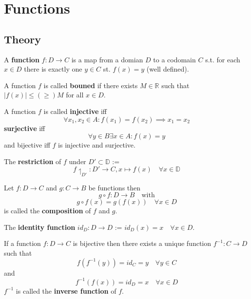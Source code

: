 \section{Functions}

\subsection{Theory}

\begin{definition}
    A \textbf{function} $f: D \to C$ is a map from a domian $D$ to a codomain $C$ s.t. for each $x \in D$ there is exactly one $y \in C$ st. $f(x) = y$ (well defined).
\end{definition}

\begin{definition}
    A function $f$ is called \textbf{bouned} if there exists $M \in \mathbb{R}$ such that $|f(x)| \leq(\geq) M$ for all $x \in D$.
\end{definition}

\begin{definition}
    A function $f$ is called \textbf{injective} iff 
    $$\forall x_1, x_2 \in A : f(x_1) = f(x_2) \implies x_1 = x_2$$
    \textbf{surjective} iff 
    $$\forall y \in B \exists x \in A : f(x) = y$$
    and bijective iff $f$ is injective and surjective.
\end{definition}

\begin{definition}
    The \textbf{restriction} of $f$ under $D' \subset \mathbb{D}$ := 
    $$f\upharpoonleft_{D'}: D' \to C, x \mapsto f(x) \quad \forall x \in \mathbb{D}$$
\end{definition}

\begin{definition}
    Let $f: D \to C$ and $g: C \to B$ be functions then
    $$g \circ f: D \to B \quad \text{with}$$
    $$g \circ f(x) = g(f(x)) \quad \forall x \in D$$
    is called the \textbf{composition} of $f$ and $g$.
\end{definition}

\begin{definition}
    The \textbf{identity function} $id_D: D \to D$ := $id_D(x) = x \quad \forall x \in D$.
\end{definition}

\begin{definition}
    If a function $f: D \to C$ is bijective then there exists a unique function $f^{-1}: C \to D$ such that
    $$ f(f^{-1}(y)) = id_C = y \quad \forall y \in C$$
    and
    $$ f^{-1}(f(x)) = id_D = x \quad \forall x \in D$$
    $f^{-1}$ is called the \textbf{inverse function} of $f$.
\end{definition}

